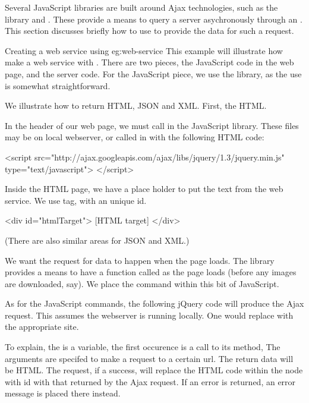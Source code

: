 Several JavaScript libraries are built around Ajax technologies, such
as the  library and . These provide a means to query a server
asychronously through an . This section discusses
briefly how to use  to provide the data for such a
request. 

\begin{example}{Creating a web service using }{eg:web-service}
  This example will illustrate how make a web service with
  . There are two pieces, the JavaScript code in the web
  page, and the server code. For the JavaScript piece, we use the
   library, as the use is somewhat straightforward.
  
  We illustrate how to return HTML, JSON and XML. First, the HTML.
  
  In the header of our web page, we must call in the 
  JavaScript library. These files may be on local webserver, or called
  in with the following HTML code:
  \begin{HTMLinput}
<script 
  src="http://ajax.googleapis.com/ajax/libs/jquery/1.3/jquery.min.js" 
  type="text/javascript">
</script>    
  \end{HTMLinput}

  Inside the HTML page, we have a place holder to put the text from
  the web service. We use  tag, with an unique id.
  \begin{HTMLinput}
<div id="htmlTarget"> [HTML target] </div>    
  \end{HTMLinput}
  (There are also similar areas for JSON and XML.)
  
  We want the request for data to happen when the page loads. The
   library provides a means to have a function called as
  the page loads (before any images are downloaded, say). We place the
  command within this bit of JavaScript.

  As for the JavaScript commands,  the following jQuery code will
  produce the Ajax request. This assumes the webserver is running
  locally. One would replace  with the appropriate site.
  To explain, the \code{\$} is a  variable, the first
  occurence is a call to its  method, The arguments are
  specifed to make a  request to a certain url. The return
  data will be HTML. The request, if a success, will replace the HTML
  code within the node with id  with that returned by
  the Ajax request. If an error is returned, an error message is placed
  there instead.
  

\end{example}

